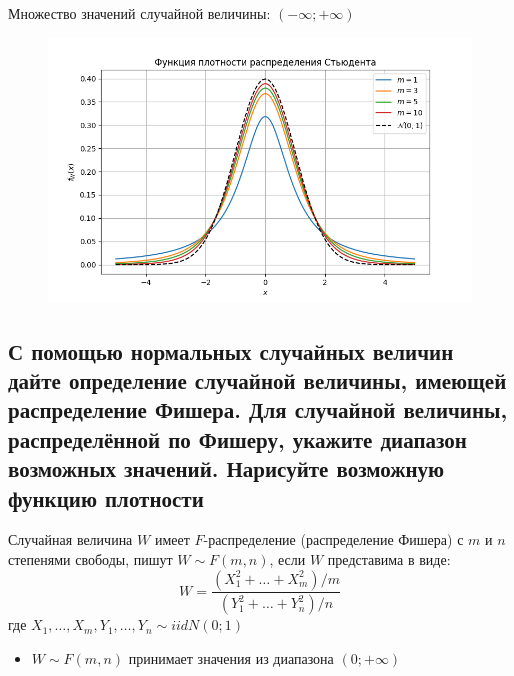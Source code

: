 \documentclass{article}
\begin{document}
Множество значений случайной величины: $(-\infty;+\infty)$


\begin{figure}[h]
    \centering
    \includegraphics[width=0.8\linewidth]{student.png}
\end{figure}


\newpage
\subsection{С помощью нормальных случайных величин дайте определение случайной величины, имеющей распределение Фишера. Для случайной величины, распределённой по Фишеру, укажите диапазон возможных значений. Нарисуйте возможную функцию плотности}
 Случайная величина $W$ имеет $F$-распределение (распределение Фишера) с $m$ и $n$ степенями свободы, пишут $W\sim F(m,n)$, если $W$ представима в виде:
\begin{equation*}
    W = \frac{(X_1^2+\ldots+X_m^2)/m}{(Y_1^2+\ldots+Y_n^2)/n}
\end{equation*}
где $X_1,\ldots,X_m,Y_1,\ldots,Y_n\sim iidN(0;1)$

\begin{itemize}
    \item $W\sim F(m,n)$ принимает значения из диапазона $(0;+\infty)$
\end{itemize}
\end{document}
